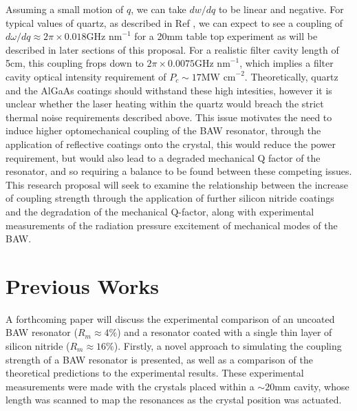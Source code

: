 \documentclass[aps,  
                a4paper, 
                amsmath, 
                amssymb, 
                preprint,
                tightenlines,  
                amsfonts,
                nofootinbib,
                onecolumn,
                titlepage,
                10pt
            ]{revtex4-2}
\begin{document}
    Assuming a small motion of $q$, we can take $dw/dq$ to be linear and negative. For typical values of quartz, as described in Ref \cite{page2021}, we can expect to see a coupling of $d\omega/dq\approx2\pi\times0.018\text{GHz nm}^{-1}$ for a 20mm table top experiment as will be described in later sections of this proposal. For a realistic filter cavity length of 5cm, this coupling frops down to $2\pi\times0.0075\text{GHz nm}^{-1}$, which implies a filter cavity optical intensity requirement of $P_c\sim17\text{MW cm}^{-2}$. Theoretically, quartz and the AlGaAs coatings should withstand these high intesities, however it is unclear whether the laser heating within the quartz would breach the strict thermal noise requirements described above. This issue motivates the need to induce higher optomechanical coupling of the BAW resonator, through the application of reflective coatings onto the crystal, this would reduce the power requirement, but would also lead to a degraded mechanical Q factor of the resonator, and so requiring a balance to be found between these competing issues. This research proposal will seek to examine the relationship between the increase of coupling strength through the application of further silicon nitride coatings and the degradation of the mechanical Q-factor, along with experimental measurements of the radiation pressure excitement of mechanical modes of the BAW.

    \section{Previous Works}
    A forthcoming paper will discuss the experimental comparison of an uncoated BAW resonator ($R_m\approx4\%$) and a resonator coated with a single thin layer of silicon nitride ($R_m\approx16\%$). Firstly, a novel approach to simulating the coupling strength of a BAW resonator is presented, as well as a comparison of the theoretical predictions to the experimental results. These experimental measurements were made with the crystals placed within a $\sim20$mm cavity, whose length was scanned to map the resonances as the crystal position was actuated. 
\end{document}
